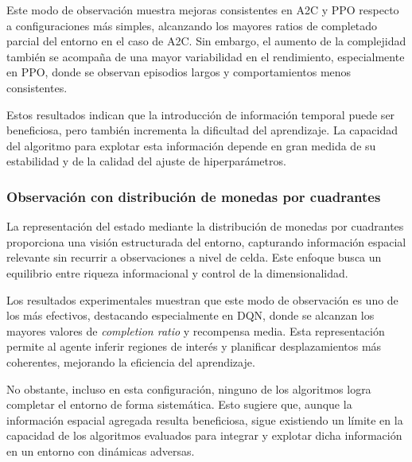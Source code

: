 Este modo de observación muestra mejoras consistentes en A2C y PPO respecto a configuraciones más simples, alcanzando los mayores ratios de completado parcial del entorno en el caso de A2C. Sin embargo, el aumento de la complejidad también se acompaña de una mayor variabilidad en el rendimiento, especialmente en PPO, donde se observan episodios largos y comportamientos menos consistentes.

Estos resultados indican que la introducción de información temporal puede ser beneficiosa, pero también incrementa la dificultad del aprendizaje. La capacidad del algoritmo para explotar esta información depende en gran medida de su estabilidad y de la calidad del ajuste de hiperparámetros.

\subsubsection{Observación con distribución de monedas por cuadrantes}

La representación del estado mediante la distribución de monedas por cuadrantes proporciona una visión estructurada del entorno, capturando información espacial relevante sin recurrir a observaciones a nivel de celda. Este enfoque busca un equilibrio entre riqueza informacional y control de la dimensionalidad.

Los resultados experimentales muestran que este modo de observación es uno de los más efectivos, destacando especialmente en DQN, donde se alcanzan los mayores valores de \textit{completion ratio} y recompensa media. Esta representación permite al agente inferir regiones de interés y planificar desplazamientos más coherentes, mejorando la eficiencia del aprendizaje.

No obstante, incluso en esta configuración, ninguno de los algoritmos logra completar el entorno de forma sistemática. Esto sugiere que, aunque la información espacial agregada resulta beneficiosa, sigue existiendo un límite en la capacidad de los algoritmos evaluados para integrar y explotar dicha información en un entorno con dinámicas adversas.

